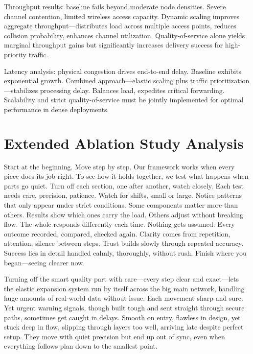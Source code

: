 \documentclass[a4paper,fleqn]{cas-dc}
\numberwithin{equation}{section}
\begin{document}
Throughput results: baseline fails beyond moderate node densities. Severe channel contention, limited wireless access capacity. Dynamic scaling improves aggregate throughput—distributes load across multiple access points, reduces collision probability, enhances channel utilization. Quality-of-service alone yields marginal throughput gains but significantly increases delivery success for high-priority traffic.

Latency analysis: physical congestion drives end-to-end delay. Baseline exhibits exponential growth. Combined approach—elastic scaling plus traffic prioritization—stabilizes processing delay. Balances load, expedites critical forwarding. Scalability and strict quality-of-service must be jointly implemented for optimal performance in dense deployments.

\section{Extended Ablation Study Analysis}

Start at the beginning. Move step by step. Our framework works when every piece does its job right. To see how it holds together, we test what happens when parts go quiet. Turn off each section, one after another, watch closely. Each test needs care, precision, patience. Watch for shifts, small or large. Notice patterns that only appear under strict conditions. Some components matter more than others. Results show which ones carry the load. Others adjust without breaking flow. The whole responds differently each time. Nothing gets assumed. Every outcome recorded, compared, checked again. Clarity comes from repetition, attention, silence between steps. Trust builds slowly through repeated accuracy. Success lies in detail handled calmly, thoroughly, without rush. Finish where you began—seeing clearer now.

Turning off the smart quality part with care—every step clear and exact—lets the elastic expansion system run by itself across the big main network, handling huge amounts of real-world data without issue. Each movement sharp and sure. Yet urgent warning signals, though built tough and sent straight through secure paths, sometimes get caught in delays. Smooth on entry, flawless in design, yet stuck deep in flow, slipping through layers too well, arriving late despite perfect setup. They move with quiet precision but end up out of sync, even when everything follows plan down to the smallest point.
\end{document}
